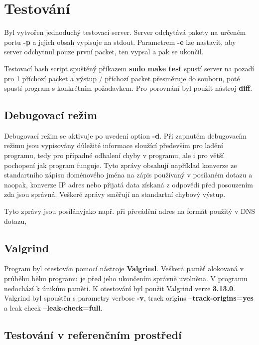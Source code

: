 \documentclass[a4paper,11pt]{article}
\begin{document}
\section{Testování}

Byl vytvořen jednoduchý testovací server. Server odchytává pakety na určeném portu \textbf{-p} a jejich obsah vypisuje na stdout. Parametrem \textbf{-e} lze nastavit, aby server odchytnul pouze první packet, ten vypsal a pak se ukončil.

Testovací bash script spuštěný příkazem \textbf{sudo make test} spustí server na pozadí pro 1 příchozí packet a výstup / příchozí packet přesměruje do souboru, poté spustí program s konkrétním požadavkem. Pro porovnání byl použit nástroj \textbf{diff}.

\subsection{Debugovací režim}

Debugovací režim se aktivuje po uvedení option \textbf{-d}. Při zapnutém debugovacím režimu jsou vypisovány důležité informace sloužící především pro ladění programu, tedy pro případné odhalení chyby v programu, ale i pro větší pochopení jak program funguje. Tyto zprávy obsahují například konverze ze standartního zápisu doménového jména na zápis používaný v posílaném dotazu a naopak, konverze IP adres nebo přijatá data získaná z odpovědi před posouzením zda jsou správná. Veškeré zprávy směřují na standartní chybový výstup.

Tyto zprávy jsou posílányjako např. při převádění adres na formát použitý v DNS dotazu, 

\subsection{Valgrind}

Program byl otestován pomocí nástroje \textbf{Valgrind}. Veškerá paměť alokovaná v průběhu běhu programu je před jeho ukončením správně uvolněna. V programu nedochází k únikům paměti. K otestování byl použit Valgrind verze \textbf{3.13.0}. Valgrind byl spouštěn s parametry verbose \textbf{-v}, track origins \textbf{--track-origins=yes} a leak check \textbf{--leak-check=full}.

\subsection{Testování v referenčním prostředí}
\end{document}
